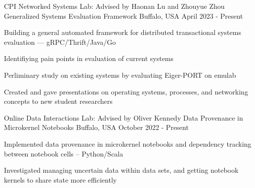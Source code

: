 

\begin{cventries}


  \cventry
    {CPI Networked Systems Lab: Advised by Haonan Lu and Zhouyue Zhou} %
    {Generalized Systems Evaluation Framework} %
    {Buffalo, USA} %
    {April 2023 - Present} %
    {
      \begin{cvitems} %
        \item Building a general automated framework for distributed transactional systems evaluation --- gRPC/Thrift/Java/Go
        \item Identifiying pain points in evaluation of current systems
        \item Perliminary study on existing systems by evaluating Eiger-PORT on emulab
        \item Created and gave presentations on operating systems, processes, and networking concepts to new student researchers
      \end{cvitems}
    }


  \cventry
    {Online Data Interactions Lab: Advised by Oliver Kennedy} %
    {Data Provenance in Microkernel Notebooks} %
    {Buffalo, USA} %
    {October 2022 - Present} %
    {
      \begin{cvitems} %
        \item Implemented data provenance in microkernel notebooks and dependency tracking between notebook cells -- Python/Scala
        \item Investigated managing uncertain data within data sets, and getting notebook kernels to share state more efficiently
      \end{cvitems}
    }

\end{cventries}
